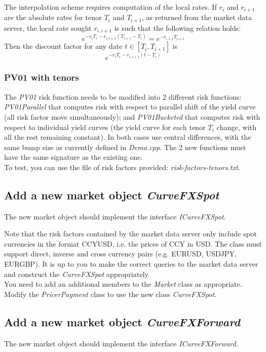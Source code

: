 \documentclass[10pt]{article}
\begin{document}
The interpolation scheme requires computation of the local rates. If $r_i$ and $r_{i+1}$ are the absolute rates for tenor $T_i$ and $T_{i+1}$, as returned from the market data server, the local rate sought $r_{i,i+1}$ is such that the following relation holds:
 $$e^{-r_iT_i-r_{i,i+1}(T_{i+1}-T_i)}=e^{-r_{i+1}T_{i+1}}$$
Then the discount factor for any date $t \in [T_i,T_{i+1}]$ is $$e^{-r_i T_i-r_{i,i+1}(t-T_i)}$$

\subsubsection{PV01 with tenors}
\label{sec:pv01}
The \textit{PV01} risk function needs to be modified into 2 different risk functions: \textit{PV01Parallel} that computes risk with respect to parallel shift of the yield curve (all risk factor move simultaneously); and \textit{PV01Bucketed} that computes risk with respect to individual yield curves (the yield curve for each tenor $T_i$ change, with all the rest remaining constant). In both cases use central differences, with the same bump size as currently defined in \textit{Demo.cpp}. The 2 new functions must have the same signature as the existing one. \\

To test, you can use the file of risk factors provided: \textit{risk-factors-tenors.txt}.

\subsection{Add a new market object \textit{CurveFXSpot}}
The new market object should implement the interface \textit{ICurveFXSpot}.

Note that the risk factors contained by the market data server only include spot currencies in the format CCYUSD, i.e. the prices of CCY in USD. The class must support direct, inverse and cross currency pairs (e.g. EURUSD, USDJPY, EURGBP). It is up to you to make the correct queries to the market data server and construct the \textit{CurveFXSpot} appropriately.\\

You need to add an additional members to the \textit{Market} class as appropriate.\\

Modify the \textit{PricerPayment} class to use the new class \textit{CurveFXSpot}.

\subsection{Add a new market object \textit{CurveFXForward}}
The new market object should implement the interface \textit{ICurveFXForward}.\\
\end{document}
